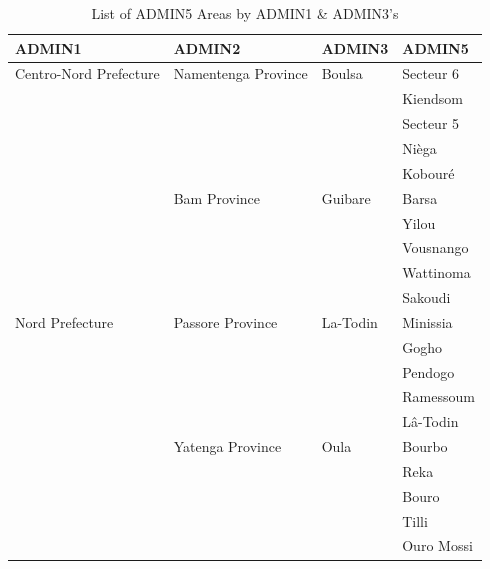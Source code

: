 \begin{table}[!h]
    \centering
    \caption{List of ADMIN5 Areas by ADMIN1 \& ADMIN3's}
    \begin{tabular}{llll}
    \hline
        ADMIN1 & ADMIN2 & ADMIN3 & ADMIN5 \\  \hline
        Centro-Nord Prefecture & Namentenga Province & Boulsa & Secteur 6 \\ 
        ~ & ~ & ~ & Kiendsom \\ 
        ~ & ~ & ~ & Secteur 5 \\ 
        ~ & ~ & ~ & Nièga \\ 
        ~ & ~ & ~ & Kobouré \\ 
        ~ & Bam Province & Guibare & Barsa \\ 
        ~ & ~ & ~ & Yilou \\ 
        ~ & ~ & ~ & Vousnango \\ 
        ~ & ~ & ~ & Wattinoma \\ 
        ~ & ~ & ~ & Sakoudi \\ 
        Nord Prefecture & Passore Province & La-Todin & Minissia \\ 
        ~ & ~ & ~ & Gogho \\ 
        ~ & ~ & ~ & Pendogo \\ 
        ~ & ~ & ~ & Ramessoum \\ 
        ~ & ~ & ~ & Lâ-Todin \\ 
        ~ & Yatenga Province & Oula & Bourbo \\ 
        ~ & ~ & ~ & Reka \\ 
        ~ & ~ & ~ & Bouro \\ 
        ~ & ~ & ~ & Tilli \\ 
        ~ & ~ & ~ & Ouro Mossi \\ \hline
    \end{tabular}
\end{table}
